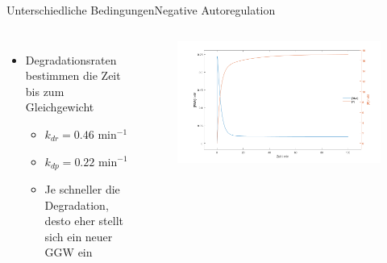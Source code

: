 \documentclass[11pt,aspectratio=169,reqno]{beamer}
\begin{document}
\begin{frame}{Unterschiedliche Bedingungen\hfill {\small \textcolor{ETHBlue}{Negative Autoregulation}}}
    \begin{columns}
        \begin{itemize}
            \item Degradationsraten bestimmen die Zeit bis zum Gleichgewicht
            \begin{itemize}
                \item $k_{dr}=0.46\text{ min$^{-1}$}$
                \item $k_{dp}=0.22\text{ min$^{-1}$}$
                \item Je schneller die Degradation, desto eher stellt sich ein neuer GGW ein
            \end{itemize}
        \end{itemize}
        
        \begin{figure}
            \centering
            \includegraphics[width=\linewidth]{images/simulations/negative_autoregulation_quicker_degradation.m.png}
        \end{figure}
    \end{columns}
\end{frame}
\end{document}
